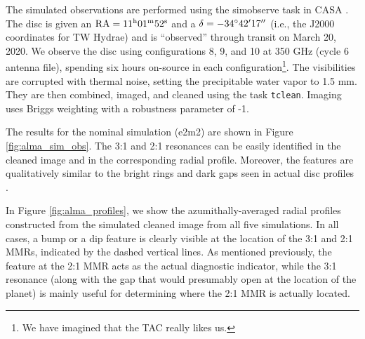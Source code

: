 The simulated observations are performed using the {\sc simobserve} task in {\sc CASA} \cite{mcmullin07}.  The disc is given an 
$\rm RA = 11^{\rm h} 01^{\rm m} 52^{\rm s}$ and a $\delta = -34^\circ 42\hbox{$^\prime$} 17\hbox{$^{\prime\prime}$}$ (i.e., the J2000 coordinates for TW 
Hydrae) and is ``observed'' through transit on March 20, 2020. We observe the disc using configurations 8, 9, and 10 at 350 GHz 
(cycle 6 antenna file), spending six hours on-source in each configuration\footnote{We have imagined that the TAC really likes 
us.}.  The visibilities are corrupted with thermal noise, setting the precipitable water vapor to 1.5 mm. They are then combined, 
imaged, and cleaned using the task {\tt tclean}. Imaging uses Briggs weighting with a robustness parameter of -1. 

The results for the nominal simulation (e2m2) are shown in Figure \ref{fig:alma_sim_obs}. The 3:1 and 2:1 resonances can be 
easily identified in the cleaned image and in the corresponding radial profile.  Moreover, the features are qualitatively similar to 
the bright rings and dark gaps seen in actual disc profiles \cite{alma15}.

In Figure \ref{fig:alma_profiles}, we show the azumithally-averaged radial profiles constructed from the simulated cleaned image 
from all five simulations. In all cases, a bump or a dip feature is clearly visible at the location of the 3:1 and 2:1 MMRs, indicated 
by the dashed vertical lines. As mentioned previously, the feature at the 2:1 MMR acts as the actual diagnostic indicator, while 
the 3:1 resonance (along with the gap that would presumably open at the location of the planet) is mainly useful for determining 
where the 2:1 MMR is actually located.

